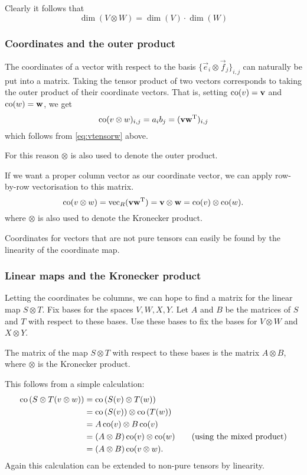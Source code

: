 Clearly it follows that
\[ \dim(V\otimes W) = \dim(V)\cdot\dim(W) \]

\subsubsection{Coordinates and the outer product}
The coordinates of a vector with respect to the basis $\{ \vec{e}_i\otimes \vec{f}_j \}_{i,j}$ can naturally be put into a matrix. Taking the tensor product of two vectors corresponds to taking the outer product of their coordinate vectors. That is, setting $\operatorname{co}(v) = \boldsymbol{\mathrm{v}}$ and $\operatorname{co}(w) = \boldsymbol{\mathrm{w}}$, we get
\[ \operatorname{co}(v\otimes w)_{i,j} = a_ib_j = (\boldsymbol{\mathrm{v}}\boldsymbol{\mathrm{w}}^{\mathrm{T}})_{i,j} \]
which follows from \eqref{eq:vtensorw} above.

For this reason $\otimes$ is also used to denote the outer product.

If we want a proper column vector as our coordinate vector, we can apply row-by-row vectorisation to this matrix.
\[ \operatorname{co}(v\otimes w) = \operatorname{vec}_R(\boldsymbol{\mathrm{v}}\boldsymbol{\mathrm{w}}^{\mathrm{T}}) = \boldsymbol{\mathrm{v}}\otimes\boldsymbol{\mathrm{w}} = \operatorname{co}(v)\otimes\operatorname{co}(w). \]
where $\otimes$ is also used to denote the Kronecker product.

Coordinates for vectors that are not pure tensors can easily be found by the linearity of the coordinate map.
\subsubsection{Linear maps and the Kronecker product}
Letting the coordinates be columns, we can hope to find a matrix for the linear map $S\otimes T$. Fix bases for the spaces $V,W,X,Y$. Let $A$ and $B$ be the matrices of $S$ and $T$ with respect to these bases. Use these bases to fix the bases for $V\otimes W$ and $X\otimes Y$.

\begin{eigenschap}
The matrix of the map $S\otimes T$ with respect to these bases is the matrix $A\otimes B$, where $\otimes$ is the Kronecker product.
\end{eigenschap}

This follows from a simple calculation:
\begin{align*}
\operatorname{co}\left(S\otimes T(v\otimes w)\right) &= \operatorname{co}\left(S(v)\otimes T(w)\right) \\
&= \operatorname{co}\left(S(v)\right)\otimes \operatorname{co}\left(T(w)\right) \\
&= A\operatorname{co}(v)\otimes B\operatorname{co}(v) \\
&= (A\otimes B)\operatorname{co}(v)\otimes\operatorname{co}(w) \qquad (\text{using the mixed product}) \\
&= (A\otimes B)\operatorname{co}(v\otimes w).
\end{align*}
Again this calculation can be extended to non-pure tensors by linearity.

